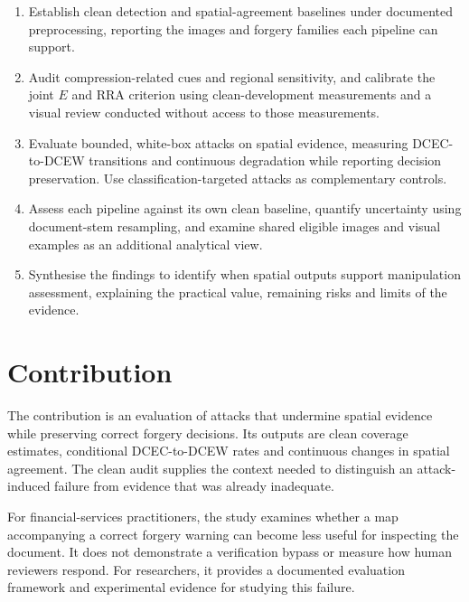 \begingroup
\renewcommand{\theenumi}{O\arabic{enumi}}
\renewcommand{\labelenumi}{\textbf{\theenumi.}}
\begin{enumerate}
    \item\label{obj:baselines} Establish clean detection and spatial-agreement baselines under documented preprocessing, reporting the images and forgery families each pipeline can support.
    \item\label{obj:evidence} Audit compression-related cues and regional sensitivity, and calibrate the joint $E$ and RRA criterion using clean-development measurements and a visual review conducted without access to those measurements.
    \item\label{obj:attack} Evaluate bounded, white-box attacks on spatial evidence, measuring DCEC-to-DCEW transitions and continuous degradation while reporting decision preservation. Use classification-targeted attacks as complementary controls.
    \item\label{obj:compare} Assess each pipeline against its own clean baseline, quantify uncertainty using document-stem resampling, and examine shared eligible images and visual examples as an additional analytical view.
    \item\label{obj:implications} Synthesise the findings to identify when spatial outputs support manipulation assessment, explaining the practical value, remaining risks and limits of the evidence.
\end{enumerate}
\endgroup

\section{Contribution}
\label{sec:intro-contribution}

The contribution is an evaluation of attacks that undermine spatial evidence while preserving correct forgery decisions. Its outputs are clean coverage estimates, conditional DCEC-to-DCEW rates and continuous changes in spatial agreement. The clean audit supplies the context needed to distinguish an attack-induced failure from evidence that was already inadequate.

For financial-services practitioners, the study examines whether a map accompanying a correct forgery warning can become less useful for inspecting the document. It does not demonstrate a verification bypass or measure how human reviewers respond. For researchers, it provides a documented evaluation framework and experimental evidence for studying this failure.

